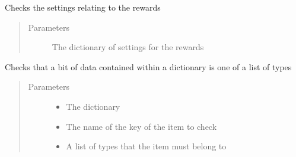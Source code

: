 \documentclass[letterpaper,10pt,english]{sphinxmanual}
\begin{document}
\begin{fulllineitems}
\label{\detokenize{source/yawning_titan.envs.generic.helpers:yawning_titan.envs.generic.helpers.environment_input_validation.check_rewards}}
\sphinxAtStartPar
Checks the settings relating to the rewards
\begin{quote}\begin{description}
\item[{Parameters}] \leavevmode
\sphinxAtStartPar
{} \textendash{} The dictionary of settings for the rewards

\end{description}\end{quote}

\end{fulllineitems}


\begin{fulllineitems}
\label{\detokenize{source/yawning_titan.envs.generic.helpers:yawning_titan.envs.generic.helpers.environment_input_validation.check_type}}
\sphinxAtStartPar
Checks that a bit of data contained within a dictionary is one of a list of types
\begin{quote}\begin{description}
\item[{Parameters}] \leavevmode\begin{itemize}
\item {}
\sphinxAtStartPar
{} \textendash{} The dictionary

\item {}
\sphinxAtStartPar
{} \textendash{} The name of the key of the item to check

\item {}
\sphinxAtStartPar
{} \textendash{} A list of types that the item must belong to

\end{itemize}

\end{description}\end{quote}

\end{fulllineitems}
\end{document}
